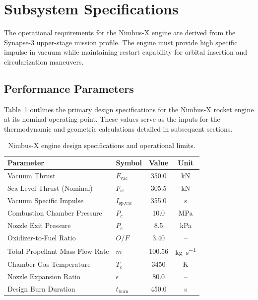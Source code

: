 \section{Subsystem Specifications}
The operational requirements for the Nimbus-X engine are derived from the Synapse-3 upper-stage mission profile. The engine must provide high specific impulse in vacuum while maintaining restart capability for orbital insertion and circularization maneuvers.

\subsection{Performance Parameters}
Table~\ref{tab:engine_specs} outlines the primary design specifications for the Nimbus-X rocket engine at its nominal operating point. These values serve as the inputs for the thermodynamic and geometric calculations detailed in subsequent sections.

\begin{table}[H]
    \centering
    \small
    \caption{Nimbus-X engine design specifications and operational limits.}
    \label{tab:engine_specs}
    \begin{tabularx}{\linewidth}{X l c c}
        \toprule
        \textbf{Parameter} & \textbf{Symbol} & \textbf{Value} & \textbf{Unit} \\
        \midrule
        Vacuum Thrust & $F_{\text{vac}}$ & 350.0 & \si{\kilo\newton} \\
        Sea-Level Thrust (Nominal) & $F_{\text{sl}}$ & 305.5 & \si{\kilo\newton} \\
        Vacuum Specific Impulse & $I_{\text{sp,vac}}$ & 355.0 & \si{\second} \\
        Combustion Chamber Pressure & $P_c$ & 10.0 & \si{\mega\pascal} \\
        Nozzle Exit Pressure & $P_e$ & 8.5 & \si{\kilo\pascal} \\
        Oxidizer-to-Fuel Ratio & $O/F$ & 3.40 & -- \\
        Total Propellant Mass Flow Rate & $\dot{m}$ & 100.56 & \si{\kilogram\per\second} \\
        Chamber Gas Temperature & $T_c$ & 3450 & \si{\kelvin} \\
        Nozzle Expansion Ratio & $\epsilon$ & 80.0 & -- \\
        Design Burn Duration & $t_{\text{burn}}$ & 450.0 & \si{\second} \\
        \bottomrule
    \end{tabularx}
\end{table}


